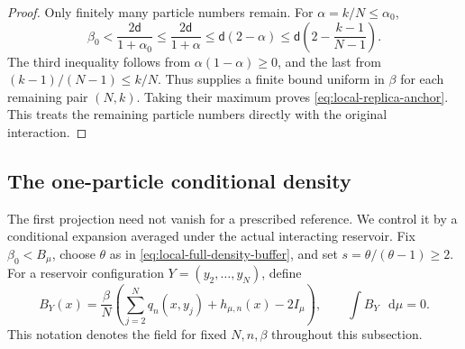 \documentclass[11pt,reqno]{amsart}
\numberwithin{equation}{section}
\theoremstyle{plain}
\theoremstyle{definition}
\renewcommand{\d}{\mathsf d}
\newcommand{\dd}{\mathop{}\!\mathrm d}
\newcommand{\be}{\beta}
\newcommand{\al}{\alpha}
\begin{document}
\begin{proof}
Only finitely many particle numbers remain. For $\al=k/N\leq\al_0$,
\begin{equation}
 \be_0<\frac{2\d}{1+\al_0}
 \leq\frac{2\d}{1+\al}
 \leq\d(2-\al)
 \leq\d\left(2-\frac{k-1}{N-1}\right).
 \label{eq:local-window-implies-collision}
\end{equation}
The third inequality follows from $\al(1-\al)\geq0$, and the last from $(k-1)/(N-1)\leq k/N$. Thus  supplies a finite bound uniform in $\be$ for each remaining pair $(N,k)$. Taking their maximum proves \eqref{eq:local-replica-anchor}. This treats the remaining particle numbers directly with the original interaction.
\end{proof}

\subsection{The one-particle conditional density}
\label{subsec:local-cavity}

The first projection need not vanish for a prescribed reference. We control it by a conditional expansion averaged under the actual interacting reservoir. Fix $\be_0<B_\mu$, choose $\theta$ as in \eqref{eq:local-full-density-buffer}, and set $s=\theta/(\theta-1)\geq2$. For a reservoir configuration $Y=(y_2,\ldots,y_N)$, define
\begin{equation}
 B_Y(x)=\frac{\be}{N}
 \left(\sum_{j=2}^Nq_n(x,y_j)+h_{\mu,n}(x)-2I_\mu\right),
 \qquad \int B_Y\,\dd\mu=0.
 \label{eq:local-cavity-field}
\end{equation}
This notation denotes the field for fixed $N,n,\be$ throughout this subsection.
\end{document}
